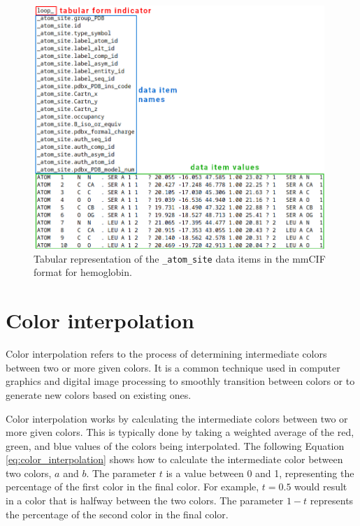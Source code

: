 \documentclass[
  digital,     %
  oneside,     %
  nosansbold,  %
  nocolorbold, %
  lof,         %
  lot,         %
]{fithesis4}
\begin{document}
\begin{figure}[htbp]
  \begin{center}
    \includegraphics[width=11cm]{figures/3bj1_mmcif.png}
  \end{center}
  \caption{Tabular representation of the \texttt{\_atom\_site} data items in the mmCIF format for hemoglobin.}
  \label{fig:mmcif}
\end{figure}

\section {Color interpolation}
\label{section:color_interpolation}


Color interpolation refers to the process of determining intermediate colors between two or more given colors. It is a common technique used in computer graphics and digital image processing to smoothly transition between colors or to generate new colors based on existing ones. \cite{zucconi2016secrets}

Color interpolation works by calculating the intermediate colors between two or more given colors. This is typically done by taking a weighted average of the red, green, and blue values of the colors being interpolated. The following Equation \ref{eq:color_interpolation} shows how to calculate the intermediate color between two colors, $a$ and $b$. The parameter $t$ is a value between 0 and 1, representing the percentage of the first color in the final color. For example, $t = 0.5$ would result in a color that is halfway between the two colors. The parameter $1 - t$ represents the percentage of the second color in the final color.
\end{document}
